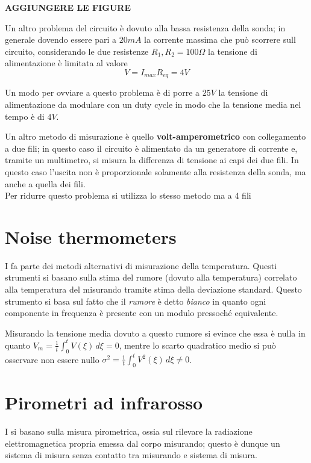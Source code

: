 	\textbf{AGGIUNGERE LE FIGURE} 
	
	Un altro problema del circuito è dovuto alla bassa resistenza della sonda; in generale dovendo essere pari a $20mA$ la corrente massima che può scorrere sull circuito, considerando le due resistenze $R_1,R_2= 100\Omega$ la tensione di alimentazione è limitata al valore
	\[ V= I_{max} R_{eq} = 4V \]
	
	Un modo per ovviare a questo problema è di porre a $25V$ la tensione di alimentazione da modulare con un duty cycle in modo che la tensione media nel tempo è di $4V$.
	
	Un altro metodo di misurazione è quello \textbf{volt-amperometrico} con collegamento a due fili; in questo caso il circuito è alimentato da un generatore di corrente e, tramite un multimetro, si misura la differenza di tensione ai capi dei due fili. In questo caso l'uscita non è proporzionale solamente alla resistenza della sonda, ma anche a quella dei fili. \\
	Per ridurre questo problema si utilizza lo stesso metodo ma a 4 fili
	
	
	
\section{Noise thermometers}
	I  fa parte dei metodi alternativi di misurazione della temperatura.  Questi strumenti si basano sulla stima del rumore (dovuto alla temperatura) correlato alla temperatura del misurando tramite stima della deviazione standard. Questo strumento si basa sul fatto che il \textit{rumore} è detto \textit{bianco} in quanto ogni componente in frequenza è presente con un modulo pressoché equivalente.
	
	
	Misurando la tensione media dovuto a questo rumore si evince che essa è nulla in quanto $V_m = \frac 1 t \int_0 ^t V(\xi)\, d\xi =0$, mentre lo scarto quadratico medio si può osservare non essere nullo $\sigma^2 = \frac 1 t \int_0 ^t V^2 (\xi)\, d\xi \neq 0$.
	
	
\section{Pirometri ad infrarosso}
	I  si basano sulla misura pirometrica, ossia sul rilevare la radiazione elettromagnetica propria emessa dal corpo misurando; questo è dunque un sistema di misura senza contatto tra misurando e sistema di misura. 
	
